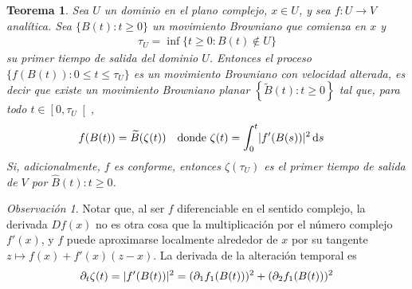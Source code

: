 \documentclass{article}
\newcommand{\dd}{\mathop{}\!\mathrm{d}}\newcommand{\complexNumbers}{\mathbb{C}}
\DeclarePairedDelimiter{\abs}{\lvert}{\rvert}
\theoremstyle{plain}
\newtheorem{theorem}{Teorema}
\theoremstyle{remark}
\newtheorem{remark}{Observación}
\begin{document}
\begin{theorem}
  Sea \(U\) un dominio en el plano complejo, \(x \in U\), y sea \(f : U \rightarrow V\) analítica.
  Sea \(\{B(t) : t \geq 0\}\) un movimiento Browniano que comienza en \(x\) y
  \begin{align}
    \tau_U
    =
    \inf \{ t \geq 0 : B(t) \notin U\}
  \end{align}
  su primer tiempo de salida del dominio \(U\).
  Entonces el proceso \(\{f(B(t)) : 0 \leq t \leq \tau_U\}\) es un movimiento Browniano con velocidad alterada, es decir que existe un movimiento Browniano planar \(\left\{ \widetilde{B}(t) : t \geq 0 \right\}\) tal que, para todo \(t \in \left[ 0, \tau_U \right[\),
  \begin{align}
    & f(B(t)) = \widetilde{B}(\zeta(t))
    &
    & \text{donde }
    \zeta(t) = \int_0^t \abs{f'(B(s))}^2 \dd s
  \end{align}
  Si, adicionalmente, \(f\) es conforme, entonces \(\zeta(\tau_U)\) es el primer tiempo de salida de \(V\) por \(\widehat{B}(t) : t \geq 0\).
\end{theorem}
\begin{remark}
  Notar que, al ser \(f\) diferenciable en el sentido complejo, la derivada \(Df(x)\) no es otra cosa que la multiplicación por el número complejo \(f'(x)\), y \(f\) puede aproximarse localmente alrededor de \(x\) por su tangente \(z \mapsto f(x) + f'(x)(z - x)\).
  La derivada de la alteración temporal es
  \begin{align}
    \partial_t \zeta(t)
    =
    \abs{f'(B(t))}^2
    =
    (\partial_1 f_1(B(t)))^2 + (\partial_2 f_1(B(t)))^2
  \end{align}
   
\end{remark}
\end{document}
